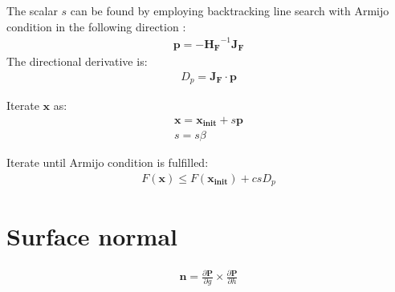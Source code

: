 \documentclass[preprint,12pt]{interact}
\begin{document}
The scalar $s$ can be found by employing backtracking line search with Armijo condition in the following direction \cite{Numerical_methods_Dennis}:
\begin{align}
	\bm{p} = -\bm{H_F}^{-1} \bm{J_F}
\end{align}
The directional derivative is:
\begin{align}
	D_p = \bm{J_F} \cdot \bm{p}
\end{align}

Iterate $\bm{x}$ as:
\begin{align}
	\bm{x} = \bm{x_{init}} + s \bm{p} \\
	s = s \beta
\end{align}

Iterate until Armijo condition is fulfilled:
\begin{align}
	F(\bm{x}) \leq F(\bm{x_{init}}) + cs D_p
\end{align}



\section{Surface normal}\label{SN}

\begin{align}
	\bm{n} = \frac{\partial \bm{P}}{\partial g} \times \frac{\partial \bm{P}}{\partial h}
\end{align}




\end{document}
